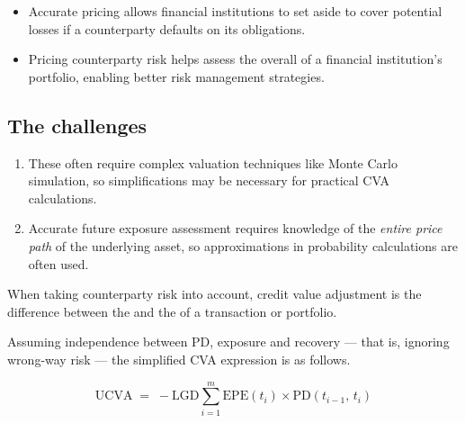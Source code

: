 
\begin{itemize}
\item Accurate pricing allows financial institutions to set aside 
to cover potential losses if a counterparty defaults on its obligations.
\item Pricing counterparty risk helps assess the overall  of a
financial institution's portfolio, enabling better risk management strategies.
\end{itemize}

\subsection*{The challenges}

\begin{enumerate}
\item {} These often require complex valuation techniques
like Monte Carlo simulation, so simplifications may be necessary for practical CVA
calculations.
\item {} Accurate future exposure assessment requires
knowledge of the \emph{entire price path} of the underlying asset, so
approximations in probability calculations are often used.
\end{enumerate}


\begin{crdefbox}[CVA]
When taking counterparty risk into account, credit value adjustment is the
difference between the  and the  of a
transaction or portfolio.
\end{crdefbox}


Assuming independence between PD, exposure and recovery --- that is, ignoring
wrong-way risk --- the simplified CVA expression is as follows.

\begin{crfmlbox}
\[ \mathrm{UCVA} \;=\; -\mathrm{LGD}\sum_{i=1}^{m}
   \mathrm{EPE}(t_i) \times \mathrm{PD}(t_{i-1},\,t_i) \]
\end{crfmlbox}

